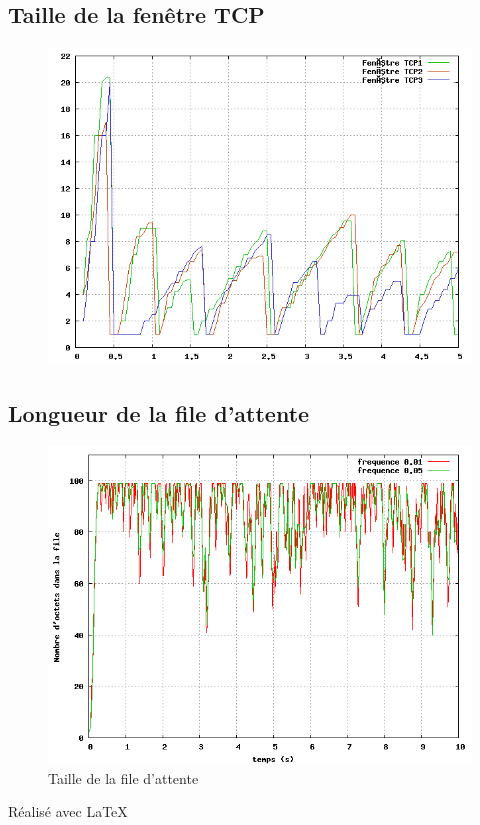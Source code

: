 \documentclass[a4paper]{article}
\begin{document}
\subsection{Taille de la fenêtre TCP}
\begin{figure}[h]
\includegraphics[width=\textwidth]{../windowSize}
\end{figure}

\subsection{Longueur de la file d'attente}
\begin{figure}[h]
\includegraphics[width=\textwidth]{../queueSize}
\caption{Taille de la file d'attente}
\end{figure}

\vfill
{\raggedleft R\'ealis\'e avec \LaTeX{} \par}
\end{document}
